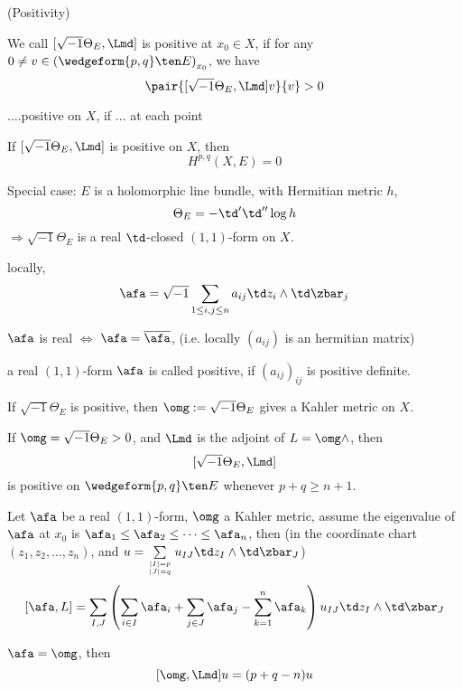 \begin{definition}(Positivity)

We call $[\sqrt{-1}\Theta_E,\Lmd]$ is positive at $x_0\in X$, if
for any $0\neq v\in\left(\wedgeform{p,q}\ten E\right)_{x_0}$, we have
$$\pair{[\sqrt{-1}\Theta_E,\Lmd]v}{v}>0$$

....positive on $X$, if ... at each point
\end{definition}

\begin{thm}
If $[\sqrt{-1}\Theta_E,\Lmd]$ is positive on $X$, then
$$H^{p,q}(X,E)=0$$
\end{thm}

Special case: $E$ is a holomorphic line bundle, with Hermitian metric $h$,
$$\Theta_E=-\td'\td''\log h$$
$\Rightarrow\sqrt{-1}\Theta_E$ is a real $\td$-closed $(1,1)$-form on $X$.

locally,
$$
     \afa=
\sqrt{-1}\sum_{1\leq i,j\leq n}
  a_{ij}\td z_i\wedge\td\zbar_j
$$

$\afa$ is real $\iff$ $\afa=\overline{\afa}$,
(i.e. locally $(a_{ij})$ is an hermitian matrix)

\begin{definition}
a real $(1,1)$-form $\afa$ is called positive, if
$(a_{ij})_{ij}$ is positive definite.
\end{definition}

\begin{lemma}
If $\sqrt{-1}\Theta_E$ is positive, then $\omg:=\sqrt{-1}\Theta_E$ gives a
Kahler metric on $X$.
\end{lemma}

\begin{lemma}
If $\omg=\sqrt{-1}\Theta_E>0$, and $\Lmd$ is the adjoint of $L=\omg\wedge$,
then
$$[\sqrt{-1}\Theta_E,\Lmd]$$
is positive on $\wedgeform{p,q}\ten E$
whenever $p+q\geq n+1$.
\end{lemma}

\begin{lemma}
Let $\afa$ be a real $(1,1)$-form, $\omg$ a Kahler metric, assume
the eigenvalue of $\afa$ at $x_0$ is $\afa_1\leq\afa_2\leq\cdots\leq\afa_n$,
then (in the coordinate chart $(z_1,z_2,...,z_n)$, and
$u=\sum\limits_{|I|=p\atop|J|=q}u_{IJ}\td z_I\wedge\td\zbar_J$)
$$
  [\afa,L]
=
  \sum_{I,J}
    \left(
      \sum_{i\in I}\afa_i
    + \sum_{j\in J}\afa_j
    - \sum_{k=1}^n\afa_k
    \right)
    u_{IJ}\td z_I\wedge\td\zbar_J
$$
\end{lemma}

\begin{cor}
$
  \afa=\omg
$, then
$$[\omg,\Lmd]u=(p+q-n)u$$
\end{cor}

